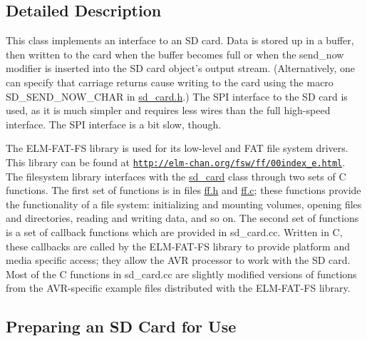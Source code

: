 \subsection{Detailed Description}
This class implements an interface to an S\-D card. Data is stored up in a buffer, then written to the card when the buffer becomes full or when the send\-\_\-now modifier is inserted into the S\-D card object's output stream. (Alternatively, one can specify that carriage returns cause writing to the card using the macro S\-D\-\_\-\-S\-E\-N\-D\-\_\-\-N\-O\-W\-\_\-\-C\-H\-A\-R in \hyperlink{sd__card_8h}{sd\-\_\-card.\-h}.) The S\-P\-I interface to the S\-D card is used, as it is much simpler and requires less wires than the full high-\/speed interface. The S\-P\-I interface is a bit slow, though.

The E\-L\-M-\/\-F\-A\-T-\/\-F\-S library is used for its low-\/level and F\-A\-T file system drivers. This library can be found at \href{http://elm-chan.org/fsw/ff/00index_e.html}{\tt http\-://elm-\/chan.\-org/fsw/ff/00index\-\_\-e.\-html}. The filesystem library interfaces with the \hyperlink{classsd__card}{sd\-\_\-card} class through two sets of C functions. The first set of functions is in files \hyperlink{ff_8h_source}{ff.\-h} and \hyperlink{ff_8c_source}{ff.\-c}; these functions provide the functionality of a file system\-: initializing and mounting volumes, opening files and directories, reading and writing data, and so on. The second set of functions is a set of callback functions which are provided in sd\-\_\-card.\-cc. Written in C, these callbacks are called by the E\-L\-M-\/\-F\-A\-T-\/\-F\-S library to provide platform and media specific access; they allow the A\-V\-R processor to work with the S\-D card. Most of the C functions in sd\-\_\-card.\-cc are slightly modified versions of functions from the A\-V\-R-\/specific example files distributed with the E\-L\-M-\/\-F\-A\-T-\/\-F\-S library.\hypertarget{classsd__card_sd_prep_card}{}\subsection{Preparing an S\-D Card for Use}\label{classsd__card_sd_prep_card}

